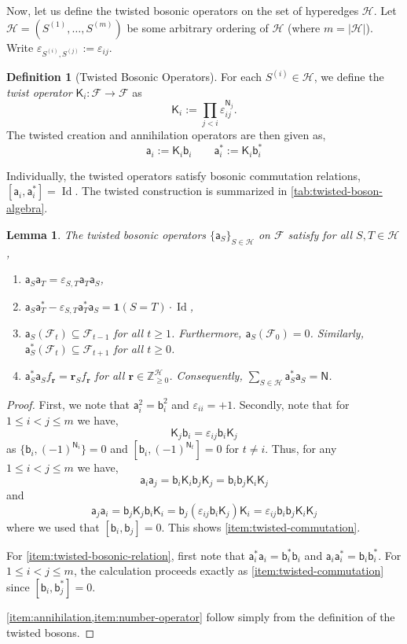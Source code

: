 \documentclass
[11pt,letterpaper]
{article}
\newtheorem{lemma}[theorem]{Lemma}
\theoremstyle{definition}
\newtheorem{definition}[theorem]{Definition}
\newcommand{\sfK}{\mathsf K}
\newcommand{\sfa}{\mathsf a}
\newcommand{\sfb}{\mathsf b}
\newcommand{\Num}{\mathsf N}
\newcommand{\eps}{\varepsilon}
\newcommand{\cF}{{\mathcal F}}
\newcommand{\1}{\mathbf{1}}
\newcommand{\Z}{\mathbb Z}
\newcommand{\cH}{\mathcal H}
\newcommand{\Id}{\operatorname{Id}}
\newcommand{\seq}{\subseteq}
\renewcommand{\geq}{\geqslant}
\renewcommand{\le}{\leqslant}
\begin{document}
Now, let us define the twisted bosonic operators on the set of hyperedges $\cH$. Let $\cH = (S^{(1)}, \ldots, S^{(m)})$ be some arbitrary ordering of $\cH$ (where $m = |\cH|$). Write $\eps_{S^{(i)}, S^{(j)}}:= \eps_{ij}$. 
\begin{definition}[Twisted Bosonic Operators]\label{def:twisted-bosonic}
    For each $S^{(i)}\in \cH$, we define the \emph{twist operator} $\sfK_i:\cF\to\cF$ as 
    \[\sfK_i := \prod_{j < i} \eps_{ij}^{\Num_j}.\]
    The twisted creation and annihilation operators are then given as, 
    \[\sfa_i := \sfK_i \sfb_i  \qquad\sfa_i^* := \sfK_i \sfb_i^*   \]
\end{definition}

Individually, the twisted operators satisfy bosonic commutation relations, $[\sfa_i, \sfa_i^*] = \Id$. The twisted construction is summarized in \cref{tab:twisted-boson-algebra}.


\begin{lemma}\label{lem:twisted-commutations}
    The twisted bosonic operators $\{\sfa_S\}_{S\in\cH}$ on $\cF$ satisfy for all $S, T\in\cH$, 
    \begin{enumerate}[(1)]
        \item\label{item:twisted-commutation} $\sfa_S\sfa_T = \eps_{S, T}\sfa_T\sfa_S$,
        \item\label{item:twisted-bosonic-relation} $\sfa_S\sfa_T^* - \eps_{S, T}\sfa_T^*\sfa_S = \1(S = T)\cdot\Id$, 
        \item\label{item:annihilation} $\sfa_S(\cF_t)\seq\cF_{t - 1}$ for all $t\geq  1$. Furthermore, $\sfa_S(\cF_0) = 0$. Similarly, $\sfa^*_S(\cF_t)\seq\cF_{t + 1}$ for all $t\geq  0$.
        \item\label{item:number-operator} $\sfa^*_S \sfa_S f_{\bm{r}} = \bm{r}_S f_{\bm{r}}$ for all $\bm{r}\in\Z_{\geq 0}^\cH$. Consequently, $\sum_{S\in\cH}\sfa_S^* \sfa_S = \Num$. 
    \end{enumerate}
\end{lemma}
\begin{proof}
First, we note that $\sfa_i^2 = \sfb_i^2$ and $\eps_{ii} =+1$. Secondly, note that for $1 \le i < j \le m$ we have,
\[
\sfK_j \sfb_i = \eps_{ij}\sfb_i \sfK_j
\]
as $\{\sfb_i, (-1)^{\Num_i}\} = 0$ and $[\sfb_i, (-1)^{\Num_t}]=0$ for $t\neq i$. Thus, for any $1 \le i < j \le m$ we have, 
\[
\sfa_i \sfa_j = \sfb_i \sfK_i \sfb_j \sfK_j = \sfb_i\sfb_j  \sfK_i \sfK_j
\]
and 
\[
\sfa_j \sfa_i = \sfb_j\sfK_j \sfb_i \sfK_i = \sfb_j \left(\eps_{ij}\sfb_i \sfK_j\right) \sfK_i = \eps_{ij}\sfb_i\sfb_j \sfK_i \sfK_j
\]
where we used that $[\sfb_i, \sfb_j] = 0$. This shows \cref{item:twisted-commutation}. 

For \cref{item:twisted-bosonic-relation}, first note that $\sfa_i^*\sfa_i = \sfb_i^*\sfb_i$ and $\sfa_i \sfa_i^* = \sfb_i \sfb_i^*$. For $1 \le i < j \le m$, the calculation proceeds exactly as \cref{item:twisted-commutation} since $[\sfb_i, \sfb_j^*] = 0$.

\cref{item:annihilation,item:number-operator} follow simply from the definition of the twisted bosons.
\end{proof}
\end{document}
